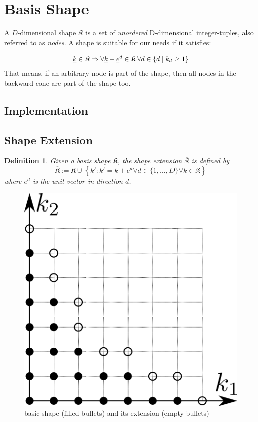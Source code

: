 \documentclass{article}
\newtheorem*{definition}{Definition}
\begin{document}
\tableofcontents
\clearpage

\section{Basis Shape}

A \(D\)-dimensional
shape \(\mathfrak{K}\)
is a set of \emph{unordered} D-dimensional integer-tuples, also
referred to as \emph{nodes}.  A shape is suitable for our needs if it
satisfies:

\begin{equation}
  \label{eq:basis_shape_fundamental_property}
  \underline{k} \in \mathfrak{K} \Rightarrow \forall
  \underline{k}-\underline{e}^d \in \mathfrak{K} \;\forall d \in \{d \;|\;k_d \geq 1\}
\end{equation}
That means, if an arbitrary node is part of the shape, then all nodes
in the backward cone are part of the shape too.

\subsection{Implementation}

\subsection{Shape Extension}

\begin{definition}
  Given a basis shape \( \mathfrak{K} \),
  the shape extension \( \overline{\mathfrak{K}} \) is defined by
  \begin{equation}
    \overline{\mathfrak{K}} := \mathfrak{K} \cup 
    \left\{\underline{k}' \colon \underline{k}' = \underline{k} + \underline{e}^d 
      \forall d \in \{1,\ldots,D\} \forall \underline{k} \in \mathfrak{K}\right\}
  \end{equation}
  where \( \underline{e}^d \) is the unit vector in direction \( d \).
\end{definition}

\begin{figure}[H]
  \begin{center}
    \includegraphics[width=0.5\linewidth]{shape_extension}
  \end{center}
  \caption{basic shape (filled bullets) and its extension (empty
    bullets)}
\end{figure}
\end{document}
